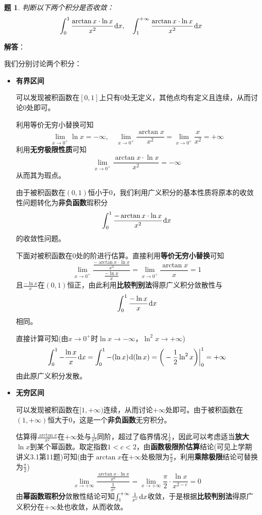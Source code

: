 \documentclass[a4paper,UTF8,fontset=windows,AutoFakeBold]{ctexart}
\newcommand*{\dr}{\hspace{0.07em}\mathrm{d}}
\theoremstyle{ex}
\newtheorem{exercise}{题}
\newcommand{\sol}[1]{{\vspace{5pt}\kaishu\noindent\textbf{解答}：\vspace{-3pt}
\begin{compactitem}
    \item[] #1
\end{compactitem}
}}
\begin{document}
\begin{framed}
\begin{exercise}
    判断以下两个积分是否收敛：
    $$\int_0^1\frac{\arctan x\cdot\ln x}{x^2}\dr x,\quad\int_1^{+\infty}\frac{\arctan x\cdot\ln x}{x^2}\dr x$$
\end{exercise}
\sol{
    我们分别讨论两个积分：
    \begin{itemize}
        \item \textbf{有界区间}
        
        可以发现被积函数在$[0,1]$上只有0处无定义，其他点均有定义且连续，从而讨论0处即可。
    
        利用等价无穷小替换可知
        $$\lim_{x\to0^+}\ln x=-\infty,\quad\lim_{x\to0^+}\frac{\arctan x}{x^2}=\lim_{x\to0^+}\frac{x}{x^2}=+\infty$$
        利用\textbf{无穷极限性质}可知
        $$\lim_{x\to0^+}\frac{\arctan x\cdot\ln x}{x^2}=-\infty$$
        从而其为瑕点。

        由于被积函数在$(0,1)$恒小于0，我们利用广义积分的基本性质将原本的收敛性问题转化为\textbf{非负函数}瑕积分
        $$\int_0^1\frac{-\arctan x\cdot\ln x}{x^2}\dr x$$
        的收敛性问题。

        下面对被积函数在0处的阶进行估算。直接利用\textbf{等价无穷小替换}可知
        $$\lim_{x\to0^+}\frac{\frac{-\arctan x\cdot\ln x}{x^2}}{\frac{-\ln x}{x}}=\lim_{x\to0^+}\frac{\arctan x}{x}=1$$
        且$\frac{-\ln x}{x}$在$(0,1)$恒正，由此利用\textbf{比较判别法}得原广义积分敛散性与
        $$\int_0^1\frac{-\ln x}{x}\dr x$$
        相同。

        直接计算可知(由$x\to0^+$时$\ln x\to-\infty$，$\ln^2x\to+\infty$)
        $$\int_0^1-\frac{\ln x}{x}\dr x=\int_0^1-(\ln x)\dr(\ln x)=\bigg(-\frac{1}{2}\ln^2x\bigg)\bigg|^1_0=+\infty$$
        由此原广义积分发散。

        \item \textbf{无穷区间}
        
        可以发现被积函数在$[1,+\infty)$连续，从而讨论$+\infty$处即可。由于被积函数在$(1,+\infty)$恒大于0，这是一个\textbf{非负函数}无穷积分。

        估算得$\frac{\arctan x}{x^2}$在$+\infty$处与$\frac{1}{x^2}$同阶，超过了临界情况$\frac{1}{x}$，因此可以考虑适当\textbf{放大}$\ln x$到某个幂函数。取定指数$1<c<2$，由\textbf{函数极限阶估算}结论(可见上学期讲义3.1第11题)可知(由于$\arctan x$在$+\infty$处极限为$\frac{\pi}{2}$，利用\textbf{乘除极限}结论可替换为$\frac{\pi}{2}$)
        $$\lim_{x\to+\infty}\frac{\frac{\arctan x\cdot\ln x}{x^2}}{\frac{1}{x^c}}=\lim_{x\to+\infty}\frac{\pi}{2}\cdot\frac{\ln x}{x^{2-c}}=0$$
        由\textbf{幂函数瑕积分}敛散性结论可知$\int_1^{+\infty}\frac{1}{x^c}\dr x$收敛，于是根据\textbf{比较判别法}得原广义积分在$+\infty$处也收敛，从而收敛。
    \end{itemize}
}
\end{framed}
\end{document}
